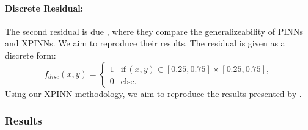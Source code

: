 \paragraph{Discrete Residual:}
The second residual is due \cite{XPINN_generalize}, where they compare the generalizeability of PINNs and XPINNs. We aim to reproduce their results. The residual is given as a discrete form:
\begin{equation*}
    f_{disc}(x,y)=
    \begin{cases}
        1 &\text{if} \, (x,y)\in [0.25,0.75]\times[0.25,0.75], \\
        0 &\text{else}.
        \label{eq:discrete_poisson}
    \end{cases}
\end{equation*}
Using our XPINN methodology, we aim to reproduce the results presented by \textcite{XPINN_generalize}.

\subsubsection{Results}
